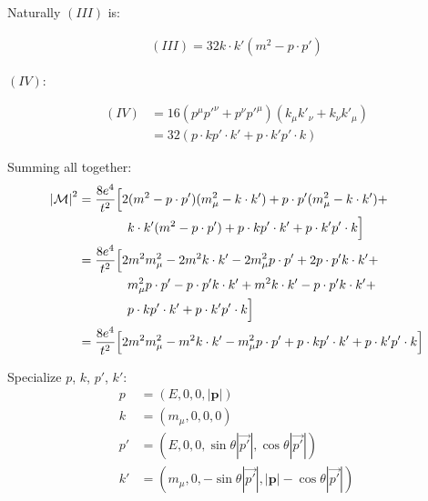 \documentclass[11pt]{article}
\begin{document}
Naturally $(III)$ is:

\begin{equation}
  \begin{split}
    (III) = 32 k \cdot k' (m^2 - p \cdot p')
  \end{split}
\end{equation}

$(IV)$:

\begin{equation}
  \begin{split}
    (IV) & = 16 (p^\mu p'^\nu + p^\nu p'^\mu) (k_\mu k'_\nu + k_\nu k'_\mu) \\
    & = 32 (p \cdot k p' \cdot k' + p \cdot k' p' \cdot k)
  \end{split}
\end{equation}

Summing all together:
\begin{equation}
  \begin{split}
    {|\cal{M}|}^2 & = \frac{8 e^4}{t^2} \Big [
      2 (m^2 - p \cdot p') (m_\mu^2 - k \cdot k') +
      p \cdot p' (m_\mu^2 - k \cdot k') + \\
      & \phantom{=====} k \cdot k' (m^2 - p \cdot p') +
      p \cdot k p' \cdot k' + p \cdot k' p' \cdot k \Big ] \\
    & = \frac{8 e^4}{t^2} \Big [
      2 m^2 m_\mu^2 - 2 m^2 k \cdot k' - 2 m_\mu^2 p \cdot p' +
        2 p \cdot p' k \cdot k' + \\
      & \phantom{=====} m_\mu^2 p \cdot p' - p \cdot p' k \cdot k' +
      m^2 k \cdot k' - p \cdot p' k \cdot k' + \\
      & \phantom{=====} p \cdot k p' \cdot k' + p \cdot k' p' \cdot k \Big ] \\
    & = \frac{8 e^4}{t^2} \Big [
      2 m^2 m_\mu^2 - m^2 k \cdot k' - m_\mu^2 p \cdot p' +
      p \cdot k p' \cdot k' + p \cdot k' p' \cdot k \Big ]
  \end{split}
\end{equation}

Specialize $p$, $k$, $p'$, $k'$:
\begin{equation}
  \begin{split}
    p & = (E,0,0,|\textbf{p}|) \\
    k & = (m_\mu, 0, 0, 0) \\
    p' & = (E, 0, 0, \sin \theta |\vec{p'}|, \cos \theta |\vec{p'}|) \\
    k' & = (m_\mu, 0, -\sin \theta |\vec{p'}|, |\textbf{p}| -
      \cos \theta |\vec{p'}|)
  \end{split}
\end{equation}
\end{document}
